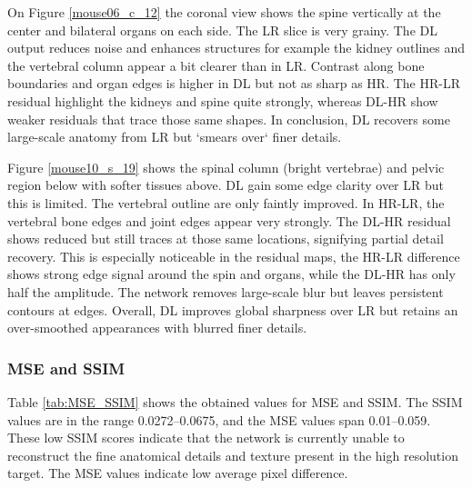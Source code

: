 \documentclass[twocolumn]{article}
\begin{document}
On Figure \ref{mouse06_c_12} the coronal view shows the spine vertically at the center and bilateral organs on each side. The LR slice is very grainy. 
The DL output reduces noise and enhances structures for example the kidney outlines and the vertebral column appear a bit clearer than in LR. 
Contrast along bone boundaries and organ edges is higher in DL but not as sharp as HR.
The HR-LR residual highlight the kidneys and spine quite strongly, whereas DL-HR show weaker residuals that trace those same shapes. 
In conclusion, DL recovers some large-scale anatomy from LR but `smears over` finer details. 

Figure \ref{mouse10_s_19} shows the spinal column (bright vertebrae) and pelvic region below with softer tissues above. 
DL gain some edge clarity over LR but this is limited. The vertebral outline are only faintly improved. 
In HR-LR, the vertebral bone edges and joint edges appear very strongly. The DL-HR residual shows reduced but still traces at those same locations, signifying partial detail recovery. 
This is especially noticeable in the residual maps, the HR-LR difference shows strong edge signal around the spin and organs, while the DL-HR has only half the amplitude. 
The network removes large-scale blur but leaves persistent contours at edges. 
Overall, DL improves global sharpness over LR but retains an over-smoothed appearances with blurred finer details.

\subsubsection{MSE and SSIM}

Table \ref{tab:MSE_SSIM} shows the obtained values for MSE and SSIM. The SSIM values are in the range 0.0272–0.0675, and the MSE values span 0.01–0.059. These low SSIM scores indicate that the network is currently unable to reconstruct the fine anatomical details and texture present in the high resolution target. The MSE values indicate low average pixel difference.
\end{document}
